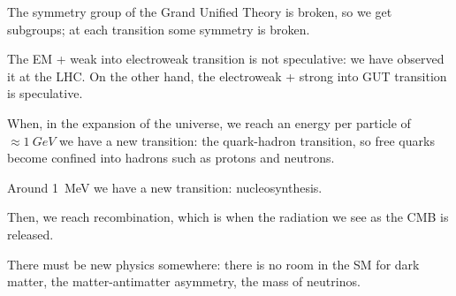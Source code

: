 \documentclass[main.tex]{subfiles}
\begin{document}
The symmetry group of the Grand Unified Theory is broken, so we get subgroups; at each transition some symmetry is broken. 

The EM + weak into electroweak transition is not speculative: we have observed it at the LHC. 
On the other hand, the electroweak + strong into GUT transition is speculative. 

When, in the expansion of the universe, we reach an energy per particle of \(\approx \SI{1}{GeV}\) we have a new transition: the quark-hadron transition, so free quarks become confined into hadrons such as protons and neutrons. 

Around \SI{1}{MeV} we have a new transition: nucleosynthesis. 

Then, we reach recombination, which is when the radiation we see as the CMB is released.

There must be new physics somewhere: there is no room in the SM for dark matter, the matter-antimatter asymmetry, the mass of neutrinos. 
\end{document}
